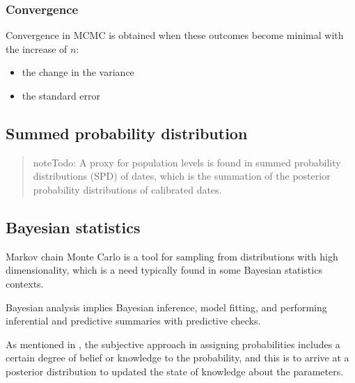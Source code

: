 \documentclass[a4paper,12pt,english]{sphinxhowto}
\begin{document}
\subsubsection{Convergence}
\label{\detokenize{MCMC:convergence}}
Convergence in MCMC is obtained when these outcomes become minimal with the increase of \(n\):
\begin{itemize}
\item {} 
the change in the variance

\item {} 
the standard error

\end{itemize}



\subsection{Summed probability distribution}
\label{\detokenize{MCMC:summed-probability-distribution}}\begin{quote}

\begin{sphinxadmonition}{note}{\label{\detokenize{MCMC:id4}}Todo:}
A proxy for population levels is found in summed probability distributions (SPD) of dates,
which is the summation of the posterior probability distributions of calibrated dates.
\end{sphinxadmonition}
\end{quote}



\subsection{Bayesian statistics}
\label{\detokenize{MCMC:bayesian-statistics}}\label{\detokenize{MCMC:bayes}}
Markov chain Monte Carlo is a tool for sampling from distributions with high dimensionality,
which is a need typically found in some Bayesian statistics contexts.

Bayesian analysis implies Bayesian inference, model fitting, and performing inferential and
predictive summaries with predictive checks.

As mentioned in {\hyperref[\detokenize{Uncertainty:uncertainty}]{}}, the subjective approach in
assigning probabilities includes a certain degree of belief or knowledge to the probability,
and this is to arrive at a posterior distribution to updated the state of knowledge about the
parameters.
\end{document}
